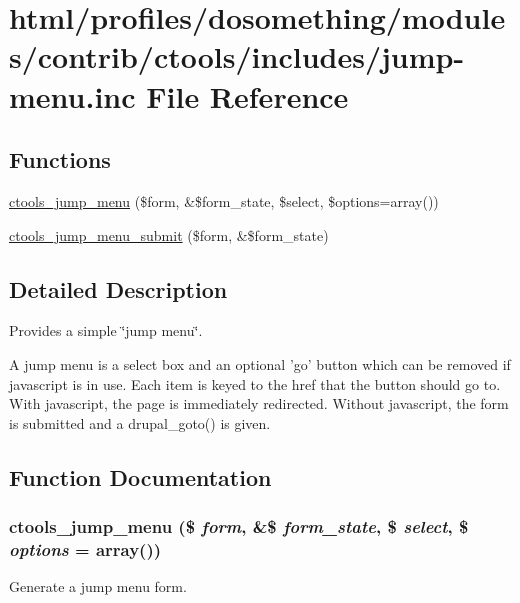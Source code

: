 \hypertarget{jump-menu_8inc}{
\section{html/profiles/dosomething/modules/contrib/ctools/includes/jump-\/menu.inc File Reference}
\label{jump-menu_8inc}
}
\subsection*{Functions}
\begin{DoxyCompactItemize}
\item 
\hyperlink{jump-menu_8inc_aaacb11546fb51a4ab5416740a18a5e67}{ctools\_\-jump\_\-menu} (\$form, \&\$form\_\-state, \$select, \$options=array())
\item 
\hyperlink{jump-menu_8inc_a68fece12f8d911934a1ffb41f0e30188}{ctools\_\-jump\_\-menu\_\-submit} (\$form, \&\$form\_\-state)
\end{DoxyCompactItemize}


\subsection{Detailed Description}
Provides a simple \char`\"{}jump menu\char`\"{}.

A jump menu is a select box and an optional 'go' button which can be removed if javascript is in use. Each item is keyed to the href that the button should go to. With javascript, the page is immediately redirected. Without javascript, the form is submitted and a drupal\_\-goto() is given. 

\subsection{Function Documentation}
\hypertarget{jump-menu_8inc_aaacb11546fb51a4ab5416740a18a5e67}{
\subsubsection[{ctools\_\-jump\_\-menu}]{\setlength{\rightskip}{0pt plus 5cm}ctools\_\-jump\_\-menu (\$ {\em form}, \/  \&\$ {\em form\_\-state}, \/  \$ {\em select}, \/  \$ {\em options} = {\ttfamily array()})}}
\label{jump-menu_8inc_aaacb11546fb51a4ab5416740a18a5e67}
Generate a jump menu form.


